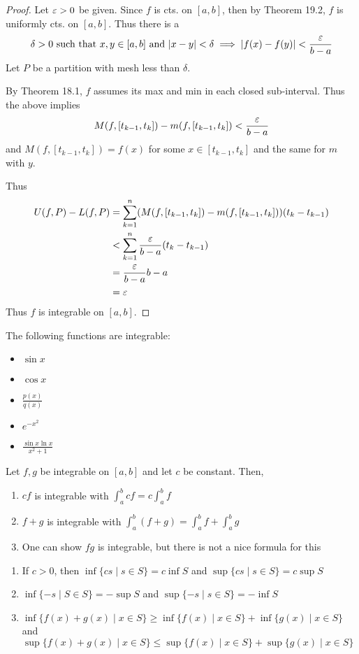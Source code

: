 \documentclass{article}
\begin{document}
  \begin{proof}
    Let $\varepsilon > 0$ be given. Since $f$ is cts. on $[a, b]$, then by Theorem 19.2, $f$ is uniformly cts. on $[a, b]$. Thus there is a \[
      \delta > 0 \text{ such that } x, y \in [a, b] \text{ and } \abs{x-y} < \delta \implies \abs{f(x) - f(y)} < \frac{\varepsilon}{b-a}
    \] Let $P$ be a partition with mesh less than $\delta$.

    By Theorem 18.1, $f$ assumes its max and min in each closed sub-interval. Thus the above implies \[
      M(f, [t_{k-1}, t_k]) - m(f, [t_{k-1}, t_k]) < \frac{\varepsilon}{b-a}
    \] and $M(f, [t_{k-1}, t_k]) = f(x)$ for some $x \in [t_{k-1}, t_k]$ and the same for $m$ with $y$.

    Thus
    \begin{align*}
      U(f, P) - L(f, P) &= \sum_{k=1}^n (M(f, [t_{k-1}, t_k]) - m(f, [t_{k-1}, t_k]))(t_k - t_{k-1})\\
      &< \sum_{k=1}^n \frac{\varepsilon}{b-a}(t_k - t_{k-1})\\
      &= \frac{\varepsilon}{b-a} b-a\\
      &= \varepsilon
    \end{align*}
    Thus $f$ is integrable on $[a, b]$.
  \end{proof}
  \begin{example}
    The following functions are integrable:
    \begin{itemize}
      \item $\sin x$
      \item $\cos x$
      \item $\frac{p(x)}{q(x)}$
      \item $e^{-x^2}$
      \item $\frac{\sin x \ln x}{x^2 + 1}$
    \end{itemize}
  \end{example}
  \begin{cthm}[Theorem 33.3]
    Let $f, g$ be integrable on $[a, b]$ and let $c$ be constant. Then,
    \begin{enumerate}
      \item $cf$ is integrable with $\int_a^b cf = c\int_a^b f$
      \item $f + g$ is integrable with $\int_a^b (f + g) = \int_a^b f + \int_a^b g$
      \item One can show $fg$ is integrable, but there is not a nice formula for this
    \end{enumerate}
  \end{cthm}
  \begin{lemma}
    \begin{enumerate}
      \item If $c > 0$, then $\inf \{cs \mid s \in S\} = c \inf S$ and $\sup \{cs \mid s \in S\} = c\sup S$
      \item $\inf \{-s \mid S \in S\} = -\sup S$ and $\sup\{-s \mid s \in S\} = -\inf S$
      \item $\inf\{f(x) + g(x) \mid x \in S\} \geq \inf \{f(x) \mid x \in S\} + \inf \{g(x) \mid x \in S\}$ and $\sup\{f(x) + g(x) \mid x \in S\} \leq \sup \{f(x) \mid x \in S\} + \sup \{g(x) \mid x \in S\}$
    \end{enumerate}
  \end{lemma}
\end{document}
